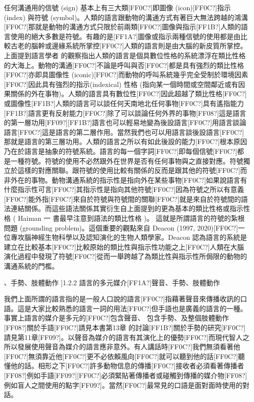 任何溝通用的信號 (sign) 基本上有三大類[FF0C?]即圖像 (icon)[FF0C?]指示 (index) 與符號 (symbol)。人類的語言跟動物的溝通方式有著巨大無法跨越的鴻溝[FF0C?]那就是動物的溝通方式只限於前兩類[FF0C?]圖像與指示[FF1B?]人類的語言使用的絕大多數是符號。有趣的是[FF1A?]圖像或指示兩種信號的使用都是由比較古老的腦幹或邊緣系統所掌控[FF0C?]人類的語言則是由大腦的新皮質所掌控。上面提到語言學者 \citet{Bolinger1968} 的觀察指出人類的語言是個具數位性格的系統漂浮在類比性格的大海上。動物的溝通[FF0C?]不論是呼叫與否[FF0C?]都是具有強烈的類比性格[FF0C?]亦即具圖像性 (iconic)[FF0C?]而動物的呼叫系統幾乎完全受制於環境因素[FF0C?]因此具有強烈的指示(indexical) 性格 (指向某一個時間或空間鄰近或有因果關係的外在事物)。人類的語言具有數位性[FF0C?]因此超越了類比性格[FF0C?]或圖像性[FF1B?]人類的語言可以談任何天南地北任何事物[FF0C?]具有遙指能力[FF1B?]語言更有反射能力[FF0C?]除了可以談論任何外界的事物[FF08?]這是語言的第一層功用[FF09?][FF1B?]語言也可以輕易地變為後設語言[FF0C?]用語言談論語言[FF0C?]這是語言的第二層作用。當然我們也可以用語言談後設語言[FF0C?]那就是語言的第三層功用。人類的語言之所以有如此後設的能力[FF0C?]根本原因乃在於語言是抽象的符號系統。語言的每一個字詞[FF0C?]即每個信號[FF0C?]都是一種符號。符號的使用不必然跟外在世界是否有任何事物與之直接對應。符號獨立於這樣的對應關聯。跟符號的使用比較有關係的反而是跟其他的符號[FF0C?]而非外在的事物。動物溝通系統的指示性是指向外在某些事物[FF0C?]如果說語言有什麼指示性可言[FF0C?]其指示性是指向其他符號[FF0C?]因為符號之所以有意義[FF0C?]能外指[FF0C?]來自於符號與符號間的關聯[FF0C?]就是來自於符號間的語法連結關係。而這些語法關係其實衍生自上面提到的更為基本的類比性格或指示性格 ( Haiman 一 書最早注意到語法的類比性格 )。 這就是所謂語言的符號的紮根問題 (grounding problem)。這個重要的觀點來自 Deacon (1997, 2020)[FF0C?]一位專攻腦神經生物科學以及認知演化的生物人類學家。Deacon 認為語言的系統是建立在比較基本[FF0C?]比較原始的類比性與指示性功能之上[FF0C?]人類在大腦演化過程中發現了符號[FF0C?]從而一舉跨越了為類比性與指示性所侷限的動物的溝通系統的門檻。

、手勢、肢體動作  ]{1.2.2 語言的多元媒介[FF1A?]聲音、手勢、肢體動作} 

我們上面所謂的語言指的是一般人口說的語言[FF0C?]指藉著聲音來傳播收訊的口語。這是大家比較熟悉的語言一詞的用法[FF0C?]但手語也是廣義的語言的一種。事實上語言的媒介是多元的[FF0C?]包含聲音、 包含手勢、及整個肢體動作[FF08?]關於手語[FF0C?]請見本書第13章 的討論[FF1B?]關於手勢的研究[FF0C?]請見第11章[FF09?]。以聲音為媒介的語言有其演化上的優勢[FF0C?]而現代智人之所以發展使用聲音為媒介的語言應非意外。有人講話時[FF0C?]我們無須看著他[FF0C?]無須靠近他[FF0C?]更不必依賴風向[FF0C?]就可以聽到他的話[FF0C?]聽懂他的話。相形之下[FF0C?]許多動物信息的傳播[FF0C?]接收者必須看著傳播者[FF08?]例如手語[FF09?][FF0C?]必須緊貼著傳播者或碰觸到傳播的媒介物[FF08?]例如盲人之間使用的點字[FF09?]。當然[FF0C?]最常見的口語是面對面時使用的對話。 

